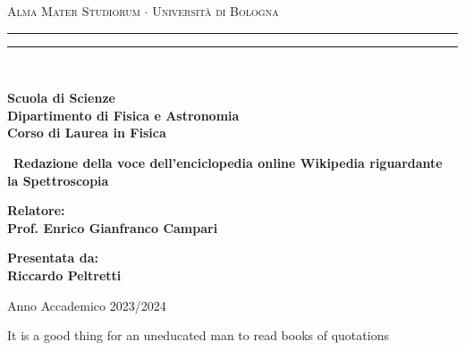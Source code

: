 \documentclass[12pt,a4paper]{report}
\begin{document}
\begin{titlepage}

\begin{center}
{{\Large{\textsc{Alma Mater Studiorum $\cdot$ Universit\`a di Bologna}}}} 
\rule[0.1cm]{15.8cm}{0.1mm}
\rule[0.5cm]{15.8cm}{0.6mm}
\\\vspace{3mm}

{\small{\bf Scuola di Scienze \\ 
Dipartimento di Fisica e Astronomia\\
Corso di Laurea in Fisica}}

\end{center}

\vspace{23mm}

\begin{center}\
{\LARGE{\bf Redazione della voce dell'enciclopedia online Wikipedia riguardante la Spettroscopia}}\\
\end{center}

\vspace{50mm} \par \noindent

\begin{minipage}[t]{0.47\textwidth}\raggedright 
{\large{\bf Relatore: \vspace{2mm}\\
Prof. Enrico Gianfranco Campari
}}
\end{minipage}
%
\hfill
%
\begin{minipage}[t]{0.47\textwidth}\raggedleft
{\large{\bf Presentata da:
\vspace{2mm}\\
Riccardo Peltretti}}
\end{minipage}

\vspace{40mm}

\begin{center}
Anno Accademico 2023/2024
\end{center}

\end{titlepage}

\vspace*{\fill}
\begin{flushright}
It is a good thing for an uneducated man to read books of quotations
\end{flushright}
\vspace*{\fill}\newpage
\end{document}
